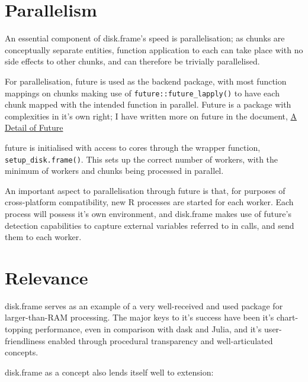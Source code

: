 \documentclass[10pt,a4paper]{article}
\begin{document}
\section{Parallelism}
\label{sec:parallelisation}

An essential component of disk.frame's speed is parallelisation; as
chunks are conceptually separate entities, function application to
each can take place with no side effects to other chunks, and can
therefore be trivially parallelised.

For parallelisation, future is used as the backend package, with most
function mappings on chunks making use of
\texttt{future::future\_lapply()} to have each chunk mapped with the
intended function in parallel. Future is a package with complexities
in it's own right; I have written more on future in the document,
\href{detail-future.pdf}{A Detail of Future}

future is initialised with access to cores through the wrapper
function, \texttt{setup\_disk.frame()}\cite{zj19:_key}. This sets up
the correct number of workers, with the minimum of workers and chunks
being processed in parallel.

An important aspect to parallelisation through future is that, for
purposes of cross-platform compatibility, new R processes are started
for each worker\cite{zj19:_using}. Each process will possess it's own
environment, and disk.frame makes use of future's detection
capabilities to capture external variables referred to in calls, and
send them to each worker.

\section{Relevance}
\label{sec:relevance}

disk.frame serves as an example of a very well-received and used
package for larger-than-RAM processing. The major keys to it's success
have been it's chart-topping performance, even in comparison with dask
and Julia, and it's user-friendliness enabled through procedural
transparency and well-articulated concepts.

disk.frame as a concept also lends itself well to extension:
\end{document}
